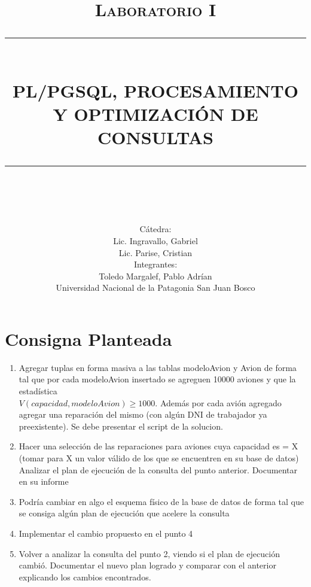 \documentclass[12pt]{report}
\newcommand{\HRule}[1]{\rule{\linewidth}{#1}}
\begin{document}
\title{ \normalsize \textsc{Laboratorio I}
    \\ [2.0cm]
    \HRule{0.5pt} \\
    \LARGE \textbf{\uppercase{PL/PGSQL, PROCESAMIENTO Y OPTIMIZACIÓN DE CONSULTAS}}
\HRule{2pt} \\ [0.5cm]}


\author{
    Cátedra: \\
    Lic. Ingravallo, Gabriel\\
    Lic. Parise, Cristian\\
    Integrantes: \\
    Toledo Margalef, Pablo Adrían \\ 
Universidad Nacional de la Patagonia San Juan Bosco}

\maketitle
\newpage

\sectionfont{\scshape}


\section*{Consigna Planteada}

\begin{enumerate}
    \item Agregar tuplas en forma masiva a las tablas modeloAvion y Avion de forma tal que por cada modeloAvion insertado se agreguen 10000 aviones y que la estadística \\$V(capacidad, modeloAvion) \geq 1000$. Además por cada avión agregado agregar una reparación del mismo (con algún DNI de trabajador ya preexistente). Se debe
        presentar el script de la solucion.
    \item Hacer una selección de las reparaciones para aviones cuya capacidad es = X (tomar para X un valor válido de los que se encuentren en su base de datos) Analizar el plan de ejecución de la consulta del punto anterior. Documentar en su informe
    \item Podría cambiar en algo el esquema físico de la base de datos de forma tal que se consiga algún plan de ejecución que acelere la consulta
    \item Implementar el cambio propuesto en el punto 4
    \item Volver a analizar la consulta del punto 2, viendo si el plan de ejecución cambió. Documentar el nuevo plan logrado y comparar con el anterior explicando los cambios encontrados.
\end{enumerate}
\end{document}
